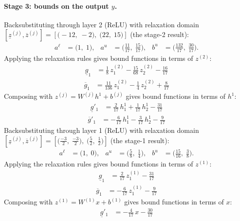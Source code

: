 \documentclass[11pt]{article}
\begin{document}
\paragraph{Stage 3: bounds on the output $y$.}
Backsubstituting through layer 2 (ReLU) with relaxation domain $[\underline{z}^{(j)}, \overline{z}^{(j)}] = [\bigl(-12,\; -2\bigr),\; \bigl(22,\; 15\bigr)]$ (the stage-2 result):
\begin{align*}
a^{\ell} &= \bigl(1,\; 1\bigr), & a^{u} &= \bigl(\frac{11}{17},\; \frac{15}{17}\bigr), & b^{u} &= \bigl(\frac{132}{17},\; \frac{30}{17}\bigr).
\end{align*}
Applying the relaxation rules gives bound functions in terms of $z^{(2)}$:
\begin{align*}
\underline{g}_{1} &= \frac{1}{8}\,z^{(2)}_{1} - \frac{15}{68}\,z^{(2)}_{2} - \frac{16}{17}
\end{align*}
\begin{align*}
\overline{g}_{1} &= \frac{11}{136}\,z^{(2)}_{1} - \frac{1}{4}\,z^{(2)}_{2} + \frac{8}{17}
\end{align*}
Composing with $z^{(j)} = W^{(j)} h^{1} + b^{(j)}$ gives bound functions in terms of $h^{1}$:
\begin{align*}
\underline{g}'_{1} &= \frac{2}{17}\,h^{1}_{1} + \frac{1}{17}\,h^{1}_{2} - \frac{31}{17}
\end{align*}
\begin{align*}
\overline{g}'_{1} &= -\frac{6}{17}\,h^{1}_{1} - \frac{3}{17}\,h^{1}_{2} - \frac{9}{17}
\end{align*}
Backsubstituting through layer 1 (ReLU) with relaxation domain $[\underline{z}^{(j)}, \overline{z}^{(j)}] = [\bigl(\frac{-3}{2},\; \frac{-3}{2}\bigr),\; \bigl(\frac{5}{2},\; \frac{1}{2}\bigr)]$ (the stage-1 result):
\begin{align*}
a^{\ell} &= \bigl(1,\; 0\bigr), & a^{u} &= \bigl(\frac{5}{8},\; \frac{1}{4}\bigr), & b^{u} &= \bigl(\frac{15}{16},\; \frac{3}{8}\bigr).
\end{align*}
Applying the relaxation rules gives bound functions in terms of $z^{(1)}$:
\begin{align*}
\underline{g}_{1} &= \frac{2}{17}\,z^{(1)}_{1} - \frac{31}{17}
\end{align*}
\begin{align*}
\overline{g}_{1} &= -\frac{6}{17}\,z^{(1)}_{1} - \frac{9}{17}
\end{align*}
Composing with $z^{(1)} = W^{(1)} x + b^{(1)}$ gives bound functions in terms of $x$:
\begin{align*}
\underline{g}'_{1} &= -\frac{4}{17}\,x - \frac{30}{17}
\end{align*}
\end{document}
